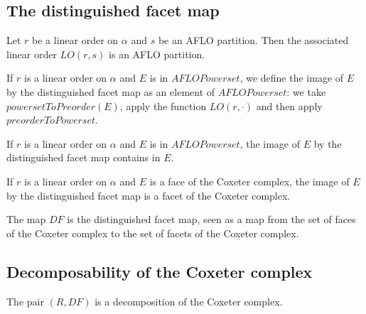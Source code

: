 \subsection{The distinguished facet map}

\begin{sublemma}
Let $r$ be a linear order on $\alpha$ and $s$ be an AFLO partition. Then the associated linear order $LO(r,s)$ is an AFLO partition.

\end{sublemma}

\begin{subdefi}[distinguishedFacet]
If $r$ is a linear order on $\alpha$ and $E$ is in $AFLOPowerset$, we define the image of $E$ by the distinguished facet map as an element
of $AFLOPowerset$: we take $powersetToPreorder(E)$, apply the function $LO(r,\cdot)$ and then apply $preorderToPowerset$.

\end{subdefi}

\begin{sublemma}
If $r$ is a linear order on $\alpha$ and $E$ is in $AFLOPowerset$, the image of $E$ by the distinguished facet map contains in $E$.

\end{sublemma}

\begin{sublemma}
If $r$ is a linear order on $\alpha$ and $E$ is a face of the Coxeter complex, the image of $E$ by the distinguished facet map is a facet
of the Coxeter complex.

\end{sublemma}

\begin{subdefi}[DF]
The map $DF$ is the distinguished facet map, seen as a map from the set of faces of the Coxeter complex to the set of facets of
the Coxeter complex.

\end{subdefi}



\subsection{Decomposability of the Coxeter complex}

\begin{sublemma}
The pair $(R,DF)$ is a decomposition of the Coxeter complex.

\end{sublemma}


